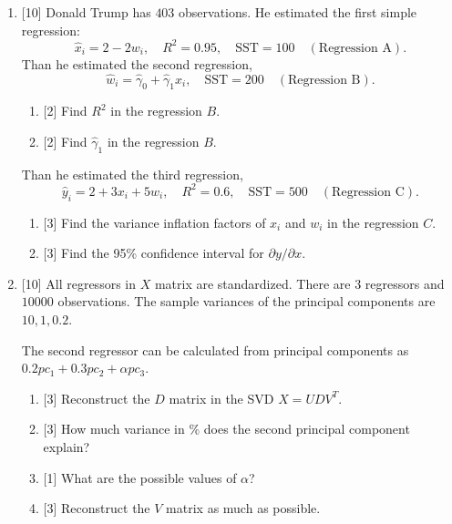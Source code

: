 \documentclass[12pt]{article}
\newcommand{\SST}{\text{SST}}
\begin{document}
\begin{enumerate}
    \item {[10]} Donald Trump has $403$ observations. 
    He estimated the first simple regression:
    \[
    \hat x_i = 2 - 2 w_i, \quad R^2 = 0.95, \quad \SST = 100 \quad (\text{Regression A}).
    \]
    Than he estimated the second regression,
    \[
    \hat w_i = \hat \gamma_0 + \hat\gamma_1 x_i, \quad \SST = 200 \quad (\text{Regression B}).
    \]
    \begin{enumerate}
        \item {[2]} Find $R^2$ in the regression $B$.
        \item {[2]} Find $\hat\gamma_1$ in the regression $B$.
    \end{enumerate}
    Than he estimated the third regression, 
    \[
    \hat y_i = 2 + 3x_i + 5w_i, \quad R^2 = 0.6, \quad \SST = 500 \quad (\text{Regression C}).
    \]
    \begin{enumerate}[resume]
        \item {[3]} Find the variance inflation factors of $x_i$ and $w_i$ in the regression $C$.
        \item {[3]} Find the 95\% confidence interval for $\partial y/\partial x$.
    \end{enumerate}
    \newpage 


    \item  {[10]} All regressors in $X$ matrix are standardized. 
    There are $3$ regressors and $10000$ observations. 
    The sample variances of the principal components are $10, 1, 0.2$.
    
    The second regressor can be calculated from principal components as $0.2 pc_1 + 0.3 pc_2 + \alpha pc_3$.
    
    \begin{enumerate}
        \item {[3]} Reconstruct the $D$ matrix in the SVD $X = UDV^T$.
        \item {[3]} How much variance in \% does the second principal component explain?
        \item {[1]} What are the possible values of $\alpha$?
        \item {[3]} Reconstruct the $V$ matrix as much as possible. 
    \end{enumerate}


    

\end{enumerate}
\end{document}

